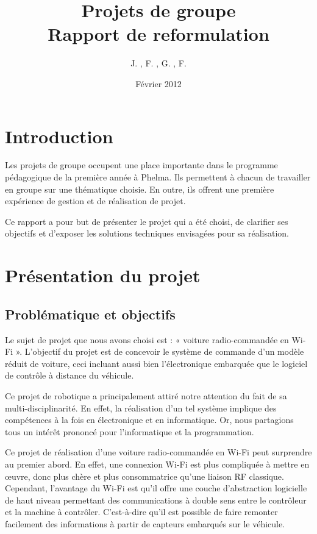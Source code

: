 \documentclass[a4paper,12pt]{report}
\title{Projets de groupe \\ Rapport de reformulation}
\author{J. \bsc{Fanguede}, F. \bsc{Castellane}, G. \bsc{Mahieux}, F. \bsc{Tavares}}
\date{Février 2012}
\begin{document}
\maketitle

\tableofcontents

\chapter*{Introduction}
Les projets de groupe occupent une place importante dans le programme pédagogique de la première année à Phelma. Ils permettent à chacun de travailler en groupe sur une thématique choisie. En outre, ils offrent une première expérience de gestion et de réalisation de projet. 

Ce rapport a pour but de présenter le projet qui a été choisi, de clarifier ses objectifs et d’exposer les solutions techniques envisagées pour sa réalisation.


\chapter{Présentation du projet}

	\section{Problématique et objectifs}
	Le sujet de projet que nous avons choisi est : « voiture radio-commandée en Wi-Fi ». L’objectif du projet est de concevoir le système de commande d’un modèle réduit de voiture, ceci incluant aussi bien l’électronique embarquée que le logiciel de contrôle à distance du véhicule.

Ce projet de robotique a principalement attiré notre attention du fait de sa multi-disciplinarité. En effet, la réalisation d’un tel système implique des compétences à la fois en électronique et en informatique. Or, nous partagions tous un intérêt prononcé pour l’informatique et la programmation.

Ce projet de réalisation d’une voiture radio-commandée en Wi-Fi peut surprendre au premier abord. En effet, une connexion Wi-Fi est plus compliquée à mettre en œuvre, donc plus chère et plus consommatrice qu’une liaison RF classique. Cependant, l’avantage du Wi-Fi est qu’il offre une couche d’abstraction logicielle de haut niveau permettant des communications à double sens entre le contrôleur et la machine à contrôler. C’est-à-dire qu’il est possible de faire remonter facilement des informations à partir de capteurs embarqués sur le véhicule.
\end{document}
